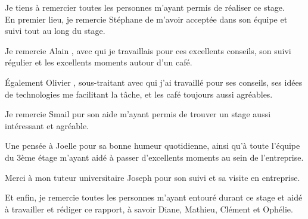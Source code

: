 Je tiens à remercier toutes les personnes m'ayant permis de réaliser ce stage.\\

En premier lieu, je remercie Stéphane  de m'avoir acceptée dans son équipe et suivi tout au long du stage.

Je remercie Alain , avec qui je travaillais pour ces excellents conseils, son suivi régulier et les excellents moments autour d'un café.

\'Egalement Olivier , sous-traitant avec qui j'ai travaillé pour ses conseils, ses idées de technologies me facilitant la tâche, et les café toujours aussi agréables.

Je remercie Smail  pur son aide m'ayant permis de trouver un stage aussi intéressant et agréable.

Une pensée à Joelle  pour sa bonne humeur quotidienne, ainsi qu'à toute l'équipe du 3ème étage m'ayant aidé à passer d'excellents moments au sein de l'entreprise.

Merci à mon tuteur universitaire Joseph  pour son suivi et sa visite en entreprise.

Et enfin, je remercie toutes les personnes m'ayant entouré durant ce stage et aidé à travailler et rédiger ce rapport, à savoir Diane, Mathieu, Clément et Ophélie.
